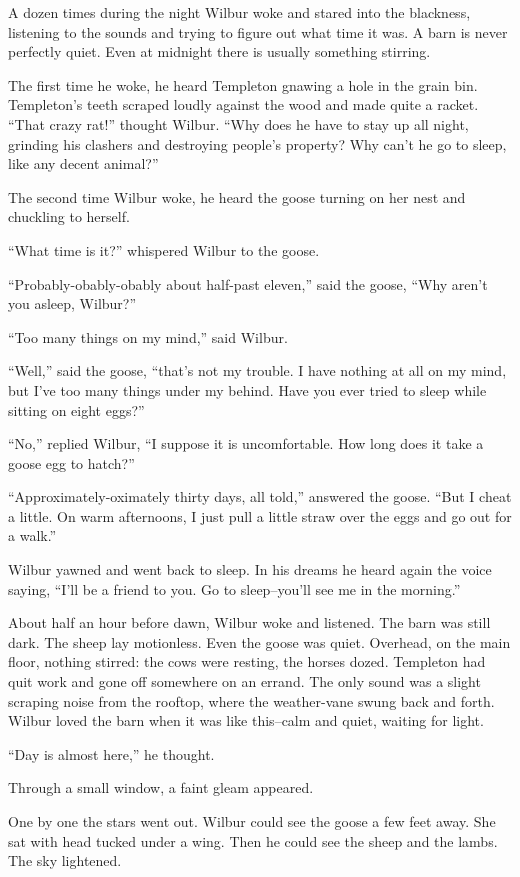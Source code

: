 \documentclass[a4paper, oneside]{book}
\begin{document}
 A dozen times during the night Wilbur woke and stared into the
blackness, listening to the sounds and trying to figure out what
time it was. A barn is never perfectly quiet. Even at midnight there 
is usually something stirring. 

 The first time he woke, he heard Templeton gnawing a hole in the
grain bin. Templeton's teeth scraped loudly against the wood and
made quite a racket. ``That crazy rat!'' thought Wilbur. ``Why does
he have to stay up all night, grinding his clashers and destroying
people's property? Why can't he go to sleep, like any decent
animal?''

 The second time Wilbur woke, he heard the goose turning on her
nest and chuckling to herself.

 ``What time is it?'' whispered Wilbur to the goose.
 
 ``Probably-obably-obably about half-past eleven,'' said the goose,
``Why aren't you asleep, Wilbur?''

 ``Too many things on my mind,'' said Wilbur.
 
 ``Well,'' said the goose, ``that's not my trouble. I have nothing at all
on my mind, but I've too many things under my behind. Have you
ever tried to sleep while sitting on eight eggs?''

 ``No,'' replied Wilbur, ``I suppose it is uncomfortable. How long
does it take a goose egg to hatch?'' 

 ``Approximately-oximately thirty days, all told,'' answered the
goose. ``But I cheat a little. On warm afternoons, I just pull a little
straw over the eggs and go out for a walk.''

 Wilbur yawned and went back to sleep. In his dreams he heard 
again the voice saying, ``I'll be a friend to you. Go to sleep--you'll
see me in the morning.'' 

 About half an hour before dawn, Wilbur woke and listened. The
barn was still dark. The sheep lay motionless. Even the goose was
quiet. Overhead, on the main floor, nothing stirred: the cows were
resting, the horses dozed. Templeton had quit work and gone off
somewhere on an errand. The only sound was a slight scraping
noise from the rooftop, where the weather-vane swung back and
forth. Wilbur loved the barn when it was like this--calm and quiet,
waiting for light.

 ``Day is almost here,'' he thought.
 
 Through a small window, a faint gleam appeared.
 
One by one the stars went out. Wilbur could see the goose a few
feet away. She sat with head tucked under a wing. Then he could
see the sheep and the lambs. The sky lightened.
\end{document}
